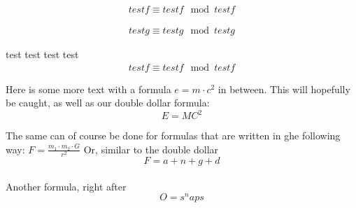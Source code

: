 
\begin{eqnarray*}
testf \equiv testf \mod testf
\end{eqnarray*}

\begin{eqnarray}
testg \equiv testg \mod testg
\end{eqnarray}

test test test test
\begin{eqnarray*}
testf \equiv testf \mod testf
\end{eqnarray*}

Here is some more text with a formula $e=m\cdot c^2$ in between. This
will hopefully be caught, as well as our double dollar formula:
$$E=MC^2$$

The same can of course be done for formulas that are written in ghe
following way: \(F = \frac{m_1 \cdot m_2 \cdot G}{r^2}\)
Or, similar to the double dollar
\[F = a + n + g + d\]\\[12pt]

Another formula, right after
\[O=s^naps\]
